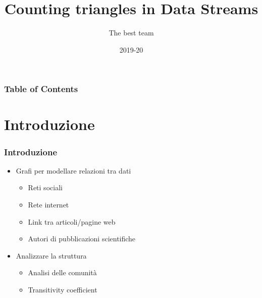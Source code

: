 \documentclass{beamer}
\title{Counting triangles in Data Streams}
\author[BJN]{The best team}
\institute[UniPD]{Universit\`a degli studi di Padova}
\date{2019-20}
\begin{document}

\frame{\titlepage}

\begin{frame}
\frametitle{Table of Contents}
\tableofcontents
\end{frame}
 
\section{Introduzione}

\begin{frame}
\frametitle{Introduzione}
\begin{itemize}
    \item Grafi per modellare relazioni tra dati
        \begin{itemize}
            \item Reti sociali
            \item Rete internet
            \item Link tra articoli/pagine web
            \item Autori di pubblicazioni scientifiche
        \end{itemize}
\end{itemize}

\begin{itemize}
    \item Analizzare la struttura
        \begin{itemize}
            \item Analisi delle comunità
            \item Transitivity coefficient
        \end{itemize}
\end{itemize}

\end{frame}
\end{document}

